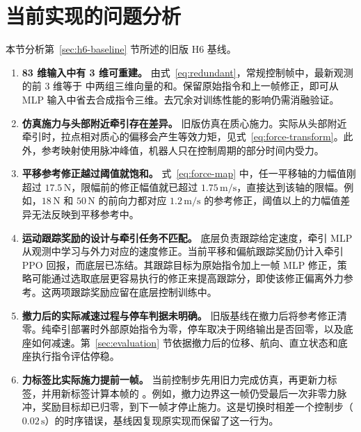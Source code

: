 \section{当前实现的问题分析}
\label{sec:h6-analysis}

本节分析第~\ref{sec:h6-baseline} 节所述的旧版 H6 基线。

\begin{enumerate}[itemsep=0.55em]
  \item \textbf{83 维输入中有 3 维可重建。}
  由式~\eqref{eq:redundant}，常规控制帧中，最新观测的前 3 维等于  中两组三维向量的和。保留原始指令和上一帧修正，即可从 MLP 输入中省去合成指令三维。去冗余对训练性能的影响仍需消融验证。

  \item \textbf{仿真施力与头部附近牵引存在差异。}
  旧版仿真在质心施力。实际从头部附近牵引时，拉点相对质心的偏移会产生等效力矩，见式~\eqref{eq:force-transform}。此外，参考映射使用脉冲峰值，机器人只在控制周期的部分时间内受力。

  \item \textbf{平移参考修正越过阈值就饱和。}
  式~\eqref{eq:force-map} 中，任一平移轴的力幅值刚超过 $17.5\,\mathrm{N}$，限幅前的修正幅值就已超过 $1.75\,\mathrm{m/s}$，直接达到该轴的限幅。例如，$18\,\mathrm{N}$ 和 $50\,\mathrm{N}$ 的前向力都对应 $1.2\,\mathrm{m/s}$ 的参考修正，阈值以上的力幅值差异无法反映到平移参考中。

  \item \textbf{运动跟踪奖励的设计与牵引任务不匹配。}
  底层负责跟踪给定速度，牵引 MLP 从观测中学习与外力对应的速度修正。当前平移和偏航跟踪奖励仍计入牵引 PPO 回报，而底层已冻结。其跟踪目标为原始指令加上一帧 MLP 修正，策略可能通过选取底层更容易执行的修正来提高跟踪分，即使该修正偏离外力参考。这两项跟踪奖励应留在底层控制训练中。

  \item \textbf{撤力后的实际减速过程与停车判据未明确。}
  旧版基线在撤力后将参考修正清零。纯牵引部署时外部原始指令为零，停车取决于网络输出是否回零，以及底座如何减速。第~\ref{sec:evaluation} 节依据撤力后的位移、航向、直立状态和底座执行指令评估停稳。

  \item \textbf{力标签比实际施力提前一帧。}
  当前控制步先用旧力完成仿真，再更新力标签，并用新标签计算本帧的 。例如，撤力边界这一帧仍受最后一次非零力脉冲，奖励目标却已归零，到下一帧才停止施力。这是切换时相差一个控制步（$0.02\,\mathrm{s}$）的时序错误，基线因复现原实现而保留了这一行为。
\end{enumerate}
